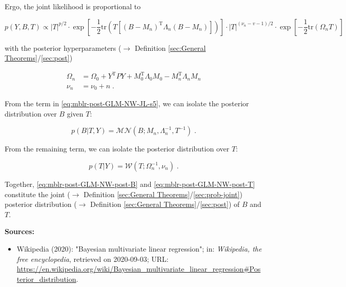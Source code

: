 \documentclass[a4paper,12pt,twoside]{book}
\begin{document}
Ergo, the joint likelihood is proportional to

\begin{equation} \label{eq:mblr-post-GLM-NW-JL-s5}
p(Y,B,T) \propto |T|^{p/2} \cdot \exp\left[ -\frac{1}{2} \mathrm{tr}\left( T \left[ (B-M_n)^\mathrm{T} \Lambda_n (B-M_n) \right] \right) \right] \cdot |T|^{(\nu_n-v-1)/2} \cdot \exp\left[ -\frac{1}{2} \mathrm{tr}\left( \Omega_n T \right) \right]
\end{equation}

with the posterior hyperparameters ($\rightarrow$ Definition \ref{sec:General Theorems}/\ref{sec:post})

\begin{equation} \label{eq:mblr-post-GLM-NW-post-T-par}
\begin{split}
\Omega_n &= \Omega_0 + Y^\mathrm{T} P Y + M_0^\mathrm{T} \Lambda_0 M_0 - M_n^\mathrm{T} \Lambda_n M_n \\
\nu_n &= \nu_0 + n \; .
\end{split}
\end{equation}

From the term in \eqref{eq:mblr-post-GLM-NW-JL-s5}, we can isolate the posterior distribution over $B$ given $T$:

\begin{equation} \label{eq:mblr-post-GLM-NW-post-B}
p(B|T,Y) = \mathcal{MN}(B; M_n, \Lambda_n^{-1}, T^{-1}) \; .
\end{equation}

From the remaining term, we can isolate the posterior distribution over $T$:

\begin{equation} \label{eq:mblr-post-GLM-NW-post-T}
p(T|Y) = \mathcal{W}(T; \Omega_n^{-1}, \nu_n) \; .
\end{equation}

Together, \eqref{eq:mblr-post-GLM-NW-post-B} and \eqref{eq:mblr-post-GLM-NW-post-T} constitute the joint ($\rightarrow$ Definition \ref{sec:General Theorems}/\ref{sec:prob-joint}) posterior distribution ($\rightarrow$ Definition \ref{sec:General Theorems}/\ref{sec:post}) of $B$ and $T$.


\vspace{1em}
\textbf{Sources:}
\begin{itemize}
\item Wikipedia (2020): "Bayesian multivariate linear regression"; in: \textit{Wikipedia, the free encyclopedia}, retrieved on 2020-09-03; URL: \url{https://en.wikipedia.org/wiki/Bayesian_multivariate_linear_regression#Posterior_distribution}.
\end{itemize}
\end{document}
